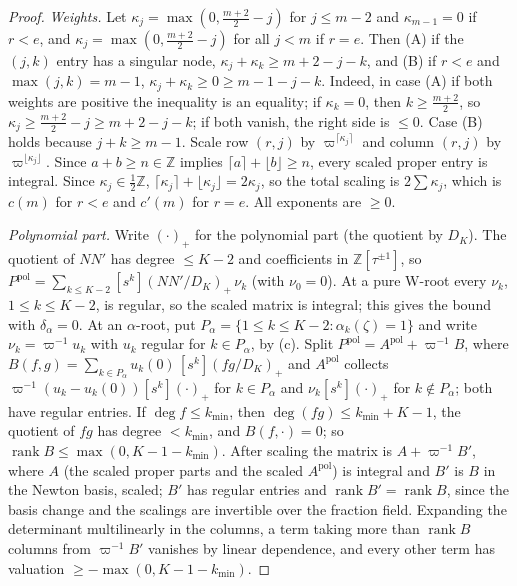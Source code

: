 \documentclass[11pt]{amsart}
\theoremstyle{definition}
\theoremstyle{remark}
\numberwithin{equation}{section}
\newcommand{\ZZ}{\mathbb{Z}}
\begin{document}
\begin{proof}
\emph{Weights.} Let $\kappa_j=\max(0,\tfrac{m+2}2-j)$ for $j\le m-2$ and $\kappa_{m-1}=0$ if $r<e$, and
$\kappa_j=\max(0,\tfrac{m+2}2-j)$ for all $j<m$ if $r=e$. Then (A) if the $(j,k)$ entry has a singular node,
$\kappa_j+\kappa_k\ge m+2-j-k$, and (B) if $r<e$ and $\max(j,k)=m-1$, $\kappa_j+\kappa_k\ge0\ge m-1-j-k$. Indeed, in
case (A) if both weights are positive the inequality is an equality; if $\kappa_k=0$, then $k\ge\frac{m+2}2$, so
$\kappa_j\ge\frac{m+2}2-j\ge m+2-j-k$; if both vanish, the right side is $\le0$. Case (B) holds because $j+k\ge m-1$.
Scale row $(r,j)$ by $\varpi^{\lceil\kappa_j\rceil}$ and column $(r,j)$ by $\varpi^{\lfloor\kappa_j\rfloor}$. Since
$a+b\ge n\in\ZZ$ implies $\lceil a\rceil+\lfloor b\rfloor\ge n$, every scaled proper entry is integral. Since
$\kappa_j\in\tfrac12\ZZ$, $\lceil\kappa_j\rceil+\lfloor\kappa_j\rfloor=2\kappa_j$, so the total scaling is
$2\sum\kappa_j$, which is $c(m)$ for $r<e$ and $c'(m)$ for $r=e$. All exponents are $\ge0$.

\emph{Polynomial part.} Write $(\cdot)_+$ for the polynomial part (the quotient by $D_K$). The quotient of $NN'$ has
degree $\le K-2$ and coefficients in $\ZZ[\tau^{\pm1}]$, so $P^{\mathrm{pol}}=\sum_{k\le K-2}[s^k](NN'/D_K)_+\,\nu_k$
(with $\nu_0=0$). At a pure W-root every $\nu_k$, $1\le k\le K-2$, is regular, so the scaled matrix is integral; this
gives the bound with $\delta_\alpha=0$. At an $\alpha$-root, put $P_\alpha=\{1\le k\le K-2:\alpha_k(\zeta)=1\}$ and
write $\nu_k=\varpi^{-1}u_k$ with $u_k$ regular for $k\in P_\alpha$, by (c). Split $P^{\mathrm{pol}}=A^{\mathrm{pol}}+
\varpi^{-1}B$, where $B(f,g)=\sum_{k\in P_\alpha}u_k(0)\,[s^k](fg/D_K)_+$ and $A^{\mathrm{pol}}$ collects
$\varpi^{-1}(u_k-u_k(0))[s^k](\cdot)_+$ for $k\in P_\alpha$ and $\nu_k[s^k](\cdot)_+$ for $k\notin P_\alpha$; both have
regular entries. If $\deg f\le k_{\min}$, then $\deg(fg)\le k_{\min}+K-1$, the quotient of $fg$ has degree
$<k_{\min}$, and $B(f,\cdot)=0$; so $\operatorname{rank}B\le\max(0,K-1-k_{\min})$. After scaling the matrix is
$A+\varpi^{-1}B'$, where $A$ (the scaled proper parts and the scaled $A^{\mathrm{pol}}$) is integral and $B'$ is $B$ in the
Newton basis, scaled; $B'$ has regular entries and $\operatorname{rank}B'=\operatorname{rank}B$, since the basis change
and the scalings are invertible over the fraction field. Expanding the determinant multilinearly in the columns, a term
taking more than $\operatorname{rank}B$ columns from $\varpi^{-1}B'$ vanishes by linear dependence, and every other term
has valuation $\ge-\max(0,K-1-k_{\min})$.
\end{proof}
\end{document}
